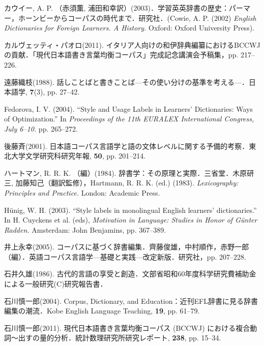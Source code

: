 \documentclass[japanese]{jnlp_1.4}
\begin{document}
\begin{thebibliography}{}
\item
カウイー, A. P. （赤須薫, 浦田和幸訳）(2003)．学習英英辞書の歴史：パーマー，ホーンビーからコーパスの時代まで．研究社．(Cowie, A. P. (2002) \textit{English Dictionaries for Foreign Learners. A History.} Oxford: Oxford University Press).

\item
カルヴェッティ・パオロ(2011). 
イタリア人向けの和伊辞典編纂におけるBCCWJの貢献．「現代日本語書き言葉均衡コーパス」完成記念講演会予稿集，pp. 217--226.

\item
遠藤織枝(1988). 
話しことばと書きことば—その使い分けの基準を考える—．日本語学, \textbf{7}(3), pp. 27--42.

\item
Fedorova, I. V. (2004). ``Style and Usage Labels in Learners' Dictionaries: 
Ways of Optimization.'' In \textit{Proceedings of the 11th EURALEX International Congress, July 6--10.} pp. 265--272.

\item
後藤斉(2001). 
日本語コーパス言語学と語の文体レベルに関する予備的考察．東北大学文学研究科研究年報, 
\textbf{50}, pp. 201--214.

\item
ハートマン, R. R. K. （編）(1984). 辞書学：その原理と実際．三省堂．木原研三, 
加藤知己（翻訳監修），Hartmann, R. R. K. (ed.) (1983). \textit{Lexicography: Principles and Practice.} London: Academic 
Press.

\item
H\"{u}nig, W. H. (2003). ``Style labels in monolingual English learners' 
dictionaries.'' In H. Cuyckens et al. (eds), \textit{Motivation in Language: Studies in Honor of G\"{u}nter Radden.} Amsterdam: John Benjamins, pp. 
367--389.

\item
井上永幸(2005). 
コーパスに基づく辞書編集．齊藤俊雄，中村順作，赤野一郎（編）．英語コーパス言語学—基礎と実践—改定新版．研究社，pp. 207--228.

\item
石井久雄(1986). 
古代的言語の享受と創造．文部省昭和60年度科学研究費補助金による一般研究(C)研究報告書．

\item
石川慎一郎(2004). Corpus, Dictionary, and Education：近刊EFL辞書に見る辞書編集の潮流．Kobe English Language Teaching, \textbf{19}, pp. 61--79.

\item
石川慎一郎(2011). 
現代日本語書き言葉均衡コーパス (BCCWJ) における複合動詞〜出すの量的分析．統計数理研究所研究レポート, 
\textbf{238}, pp. 15--34.


\end{thebibliography}
\end{document}

